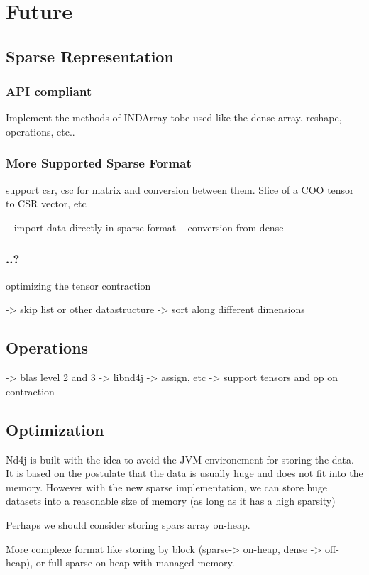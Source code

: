 \chapter{Future}

\section{Sparse Representation}

\subsection{API compliant}
Implement the methods of INDArray tobe used like the dense array.
reshape, operations, etc..
\subsection{More Supported Sparse Format}
support csr, csc for matrix and conversion between them. Slice of a COO tensor to CSR vector, etc

-- import data directly in sparse format
-- conversion from dense

\subsection{ ..?}
optimizing the tensor contraction

-> skip list or other datastructure 
-> sort along different dimensions


\section{Operations}
-> blas level 2 and 3
-> libnd4j -> assign, etc
-> support tensors and op on contraction

\section{Optimization}
Nd4j is built with the idea to avoid the JVM environement for storing the data. It is based on the postulate that the data is usually huge and does not fit into the memory. However with the new sparse implementation, we can store huge datasets into a reasonable size of memory (as long as it has a high sparsity)

Perhaps we should consider storing spars array on-heap.

More complexe format like storing by block (sparse-> on-heap, dense -> off-heap), or full sparse on-heap with managed memory. 